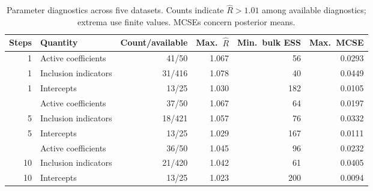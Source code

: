 \begin{table}[!t]
\centering
\caption{Parameter diagnostics across five datasets. Counts indicate $\widehat R>1.01$ among available diagnostics; extrema use finite values. MCSEs concern posterior means.}
\label{tab:DM_parameter_diagnostics}
\fontsize{12}{9}\selectfont
\begin{tabular}{rlrrrr}
\toprule
Steps & Quantity & Count/available & Max.\ $\widehat R$ & Min.\ bulk ESS & Max.\ MCSE \\
\midrule
1 & Active coefficients & 41/50 & 1.067 & 56 & 0.0293 \\
1 & Inclusion indicators & 31/416 & 1.078 & 40 & 0.0449 \\
1 & Intercepts & 13/25 & 1.030 & 182 & 0.0105 \\
\addlinespace
5 & Active coefficients & 37/50 & 1.067 & 64 & 0.0197 \\
5 & Inclusion indicators & 18/421 & 1.057 & 76 & 0.0332 \\
5 & Intercepts & 13/25 & 1.029 & 167 & 0.0111 \\
\addlinespace
10 & Active coefficients & 36/50 & 1.045 & 96 & 0.0232 \\
10 & Inclusion indicators & 21/420 & 1.042 & 61 & 0.0405 \\
10 & Intercepts & 13/25 & 1.023 & 200 & 0.0094 \\
\bottomrule
\end{tabular}
\end{table}
